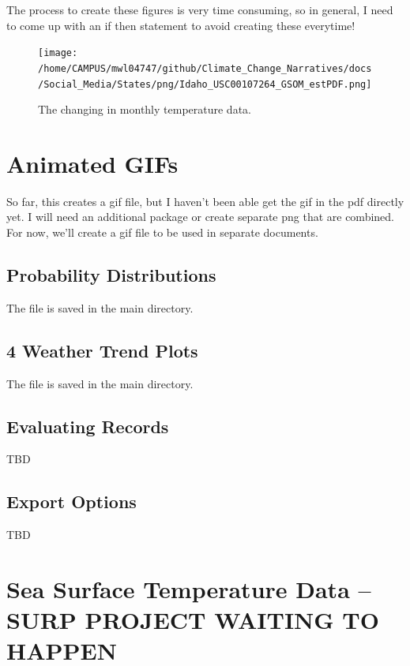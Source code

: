 \documentclass{article}\usepackage[]{graphicx}\usepackage[]{color}
\begin{document}
The process to create these figures is very time consuming, so in general, I need to come up with an if then statement to avoid creating these everytime!

\begin{figure}
\texttt{[image: /home/CAMPUS/mwl04747/github/Climate\_Change\_Narratives/docs/Social\_Media/States/png/Idaho\_USC00107264\_GSOM\_estPDF.png]}
\caption{The changing in monthly temperature data.}
\label{fig:GSOM_estPDF}
\end{figure}

\section{Animated GIFs}

So far, this creates a gif file, but I haven't been able get the gif in the pdf directly yet. I will need an additional package or create separate png that are combined. For now, we'll create a gif file to be used in separate documents.

\subsection{Probability Distributions}




The file is saved in the main directory. 


\subsection{4 Weather Trend Plots}




The file is saved in the main directory. 


\subsection{Evaluating Records}

TBD

\subsection{Export Options}

TBD

\section{Sea Surface Temperature Data -- SURP PROJECT WAITING TO HAPPEN}
\end{document}
